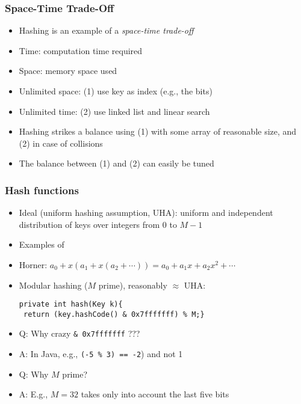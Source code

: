 \documentclass[handout]{beamer}
\begin{document}
\begin{frame}
    \frametitle{Space-Time Trade-Off}

\begin{itemize}[<+->]
\item Hashing is an example of a \emph{space-time trade-off}
\item Time: computation time required %
\item Space: memory space used %
\item Unlimited space: (1) use key as index (e.g., the bits)
\item Unlimited time: (2) use linked list and linear search 
\item Hashing strikes a balance using (1) with some array of reasonable size,
and (2) in case of collisions
\item The balance between (1) and (2) can easily be tuned
\end{itemize}
\end{frame}

\begin{frame}[fragile]
    \frametitle{Hash functions}

\begin{itemize}[<+->]
\item Ideal (uniform hashing assumption, UHA): uniform and independent
distribution of keys over integers from 0 to $M-1$
\item Examples of \href{https://en.wikipedia.org/wiki/Java_hashCode()}%
{\color{red}{hash functions in Java}}
\item Horner: $a_0 + x ( a_1 + x ( a_2 + \cdots))= a_0 + a_1 x + a_2 x^2 + \cdots$ 
\item Modular hashing ($M$ prime), reasonably $\approx$ UHA:
\begin{verbatim}
private int hash(Key k){
 return (key.hashCode() & 0x7fffffff) % M;}
\end{verbatim}
\item Q: Why crazy {\tt \& 0x7fffffff}  ???
\item A: In Java, e.g., {\tt (-5 \% 3) == -2}) and not 1 
\item Q: Why $M$ prime? 
\item A: E.g., $M=32$ takes only into account the last five bits
\end{itemize}
\end{frame}
\end{document}

